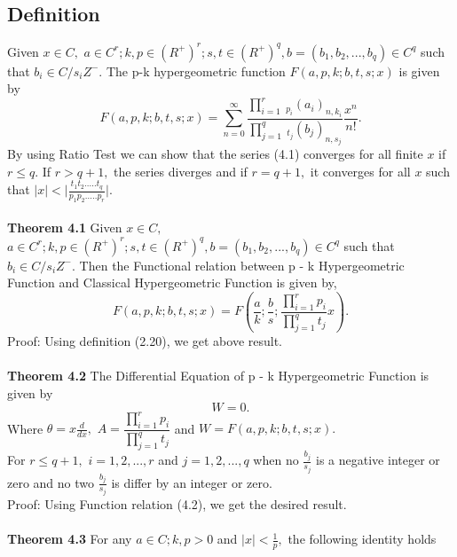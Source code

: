 \documentclass[11pt,a4paper]{article}
\numberwithin{equation}{section}
\begin{document}
\subsection{Definition}
Given $ x \in C, $ $ a\in C^{r}; k,p \in (R^{+})^{r}; s,t \in (R^{+})^{q}, b=(b_{1},b_{2},...,b_{q})\in C^{q} $ such that $b_{i} \in C/ s_{i}Z^{-}.$ The p-k hypergeometric function $ F(a,p,k;b,t,s;x)$ is given by 
 \begin{equation}
   F(a,p,k;b,t,s;x)= \sum_{n=0}^{\infty}\frac{\prod_{i=1}^{r}\:_{p_{i}}(a_{i})_{n,k_{i}}}{\prod_{j=1}^{q}\:_{t_{j}}(b_{j})_{n,s_{j}}}\frac{x^{n}}{n!}.
   \end{equation} 
By using Ratio Test we can show that the series (4.1) converges for all finite $ x $ if $ r\leq q.$ If $ r > q+1, $ the series diverges and if $ r = q+1, $ it converges for all $ x $ such that $ \vert x \vert < \vert\frac{t_{1}t_{2}.....t_{q}}{p_{1}p_{2}.....p_{r}}\vert. $ \\\\
\textbf{Theorem 4.1} Given $ x \in C, $ $ a\in C^{r}; k,p \in (R^{+})^{r}; s,t \in (R^{+})^{q}, b=(b_{1},b_{2},...,b_{q})\in C^{q} $ such that $b_{i} \in C/ s_{i}Z^{-}.$ Then the Functional relation between p - k Hypergeometric Function and Classical Hypergeometric Function is given by,
\begin{equation}
F(a,p,k;b,t,s;x)=F(\frac{a}{k};\frac{b}{s};\frac{\prod_{i=1}^{r}p_{i}}{\prod_{j=1}^{q}t_{j}}x).
\end{equation} 
Proof: Using definition (2.20), we get above result.\\\\
\textbf{Theorem 4.2} The Differential Equation of p - k Hypergeometric Function is given by 
\begin{equation}
[\theta \prod_{j=1}^{q}(\theta + \frac{b_{j}}{s_{j}}-1)-Ax\prod_{i=1}^{r}(\theta + \frac{a_{i}}{k_{i}}) ]W=0.
\end{equation}
Where $ \theta = x\frac{d}{dx}, $ $ A=\dfrac{\prod_{i=1}^{r}p_{i}}{\prod_{j=1}^{q}t_{j}} $ and $ W= F(a,p,k;b,t,s;x).$\\
For $ r\leq q+1,$ $i=1,2,...,r $ and $ j=1,2,...,q $ when no $ \frac{b_{j}}{s_{j}} $ is a negative integer or zero and no two $ \frac{b_{j}}{s_{j}} $ is differ by an integer or zero.\\
Proof: Using Function relation (4.2), we get the desired result.\\\\
\textbf{Theorem 4.3} For any $ a\in C; k,p > 0 $ and $ \vert x \vert <\frac{1}{p}, $ the following identity holds
\end{document}
